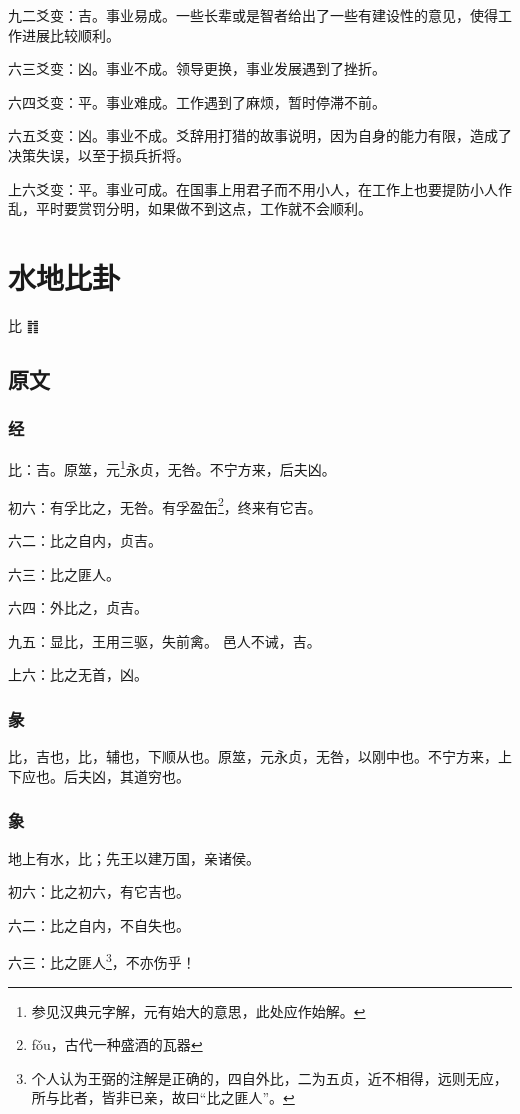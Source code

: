 \documentclass[12pt,oneside]{book}
\begin{document}
九二爻变：吉。事业易成。一些长辈或是智者给出了一些有建设性的意见，使得工作进展比较顺利。

六三爻变：凶。事业不成。领导更换，事业发展遇到了挫折。

六四爻变：平。事业难成。工作遇到了麻烦，暂时停滞不前。

六五爻变：凶。事业不成。爻辞用打猎的故事说明，因为自身的能力有限，造成了决策失误，以至于损兵折将。

上六爻变：平。事业可成。在国事上用君子而不用小人，在工作上也要提防小人作乱，平时要赏罚分明，如果做不到这点，工作就不会顺利。


\chapter{水地比卦}
比 {\Large ䷇}

\section{原文}
\subsection{经}
比：吉。原筮，元\footnote{参见汉典元字解，元有始大的意思，此处应作始解。}永贞，无咎。不宁方来，后夫凶。

初六：有孚比之，无咎。有孚盈缶\footnote{fǒu，古代一种盛酒的瓦器}，终来有它吉。

六二：比之自内，贞吉。

六三：比之匪人。

六四：外比之，贞吉。

九五：显比，王用三驱，失前禽。 邑人不诫，吉。

上六：比之无首，凶。

\subsection{彖}
比，吉也，比，辅也，下顺从也。原筮，元永贞，无咎，以刚中也。不宁方来，上下应也。后夫凶，其道穷也。

\subsection{象}
地上有水，比；先王以建万国，亲诸侯。

初六：比之初六，有它吉也。

六二：比之自内，不自失也。

六三：比之匪人\footnote{个人认为王弼的注解是正确的，四自外比，二为五贞，近不相得，远则无应，所与比者，皆非已亲，故曰“比之匪人”。}，不亦伤乎！
\end{document}
